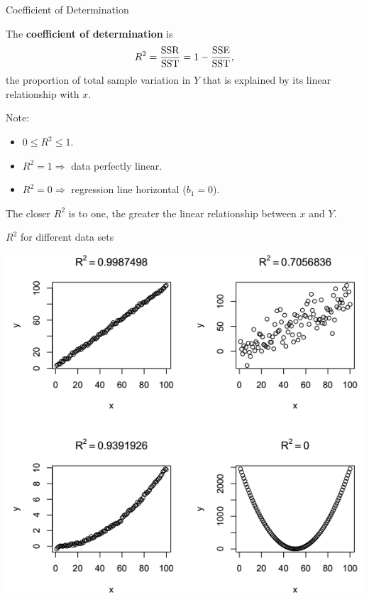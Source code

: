 \documentclass{beamer}
\begin{document}
\begin{frame}{Coefficient of Determination}
\begin{definition}
The \textbf{coefficient of determination} is
$$
R^2=\frac{\rm SSR}{\rm SST}=1-\frac{\rm SSE}{\rm SST},
$$
the proportion of total sample variation in $Y$ that is explained by its linear relationship with $x$.
\end{definition} 
\pause Note:
\begin{itemize}
\item $0\le R^2\le 1$.
\item $R^2=1\Rightarrow$ data perfectly linear.
\item $R^2=0\Rightarrow$ regression line horizontal ($b_1=0$).
\end{itemize}
\pause The closer $R^2$ is to one, the greater the linear relationship between $x$ and $Y$.
\end{frame}

\begin{frame}{$R^2$ for different data sets}
\begin{center}
\includegraphics[scale=0.4]{plots/R-squared}
\end{center}
\end{frame}
\end{document}
